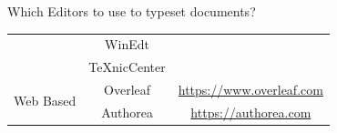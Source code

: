 \documentclass[style=lehigh,orient=landscape]{powerdot}
\newcommand{\cmark}{\ding{51}}
\begin{document}
\begin{wideslide}[toc=]{Which Editors to use to typeset documents?}
\begin{center}
\begin{tabular}{|c|c|ccc|}
                                         & WinEdt       & \cmark  &          &        \\
                                         & TeXnicCenter & \cmark  &          &        \\
        \hline
        \multirow{2}{*}{Web Based}       & Overleaf      & \multicolumn{3}{c|}{\url{https://www.overleaf.com}}\\
                                         & Authorea      & \multicolumn{3}{c|}{\url{https://authorea.com}}\\
        \hline
        \end{tabular}
    \end{center}
\end{wideslide}
\end{document}
